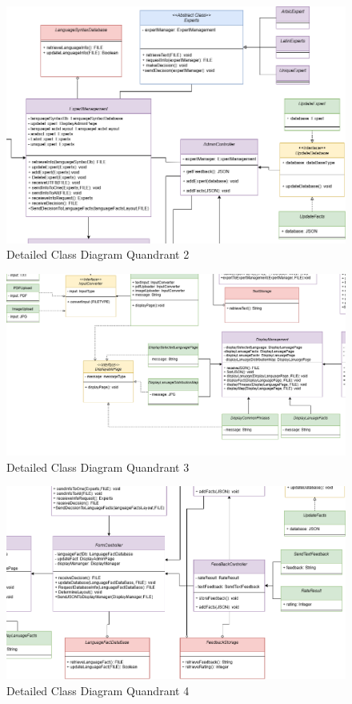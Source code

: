 \begin{figure}[H]
	\centering
	\includegraphics[width=\textwidth, height=\textheight, keepaspectratio]{Section4/images/LangufiyClassDiagramV5Q2.png}
	\caption{Detailed Class Diagram Quandrant 2}
	\label{DetailedClassDiagramQ2}
\end{figure}

\begin{figure}[H]
	\centering
	\includegraphics[width=\textwidth, height=\textheight, keepaspectratio]{Section4/images/LangufiyClassDiagramV5Q3.png}
	\caption{Detailed Class Diagram Quandrant 3}
	\label{DetailedClassDiagramQ3}
\end{figure}

\begin{figure}[H]
	\centering
	\includegraphics[width=\textwidth, height=\textheight, keepaspectratio]{Section4/images/LangufiyClassDiagramV5Q4.png}
	\caption{Detailed Class Diagram Quandrant 4}
	\label{DetailedClassDiagramQ4}
\end{figure}